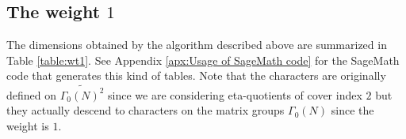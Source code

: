 \documentclass[12pt]{amsart}
\numberwithin{equation}{section}
\theoremstyle{plain}
\theoremstyle{definition}
\newtheorem{examp}[thm]{Example}
\theoremstyle{remark}
\newcommand\numC{\mathbb{C}}
\newcommand\Dcover[2]{\widetilde{#1^{#2}}}
\begin{document}

\subsection{The weight $1$}
\label{subsec:weight1}
The dimensions obtained by the algorithm described above are summarized in Table \ref{table:wt1}. See Appendix \ref{apx:Usage of SageMath code} for the SageMath code that generates this kind of tables. Note that the characters are originally defined on $\Dcover{\Gamma_0(N)}{2}$ since we are considering eta-quotients of cover index $2$ but they actually descend to characters on the matrix groups $\Gamma_0(N)$ since the weight is $1$.
\end{document}
